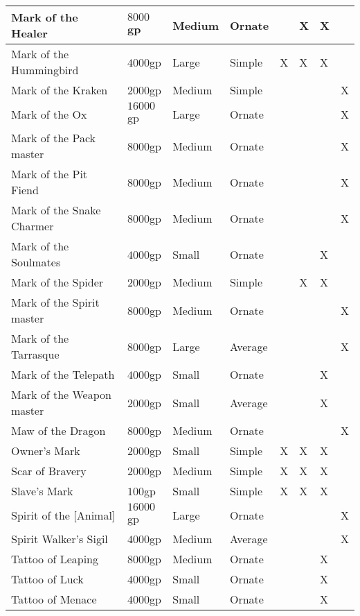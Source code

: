 \documentclass[a5paper,8pt]{book}
\begin{document}
\begin{tabularx}{\textwidth}{|lZZZYYYY|}
    Mark of the Healer & $8000$gp  & Medium  & Ornate  & ~ & X & X & ~ \\\hline 
    Mark of the Hummingbird & $4000$gp  & Large   & Simple  & X & X & X & ~ \\\hline 
    Mark of the Kraken & $2000$gp  & Medium  & Simple  & ~ & ~ & ~ & X \\\hline 
    Mark of the Ox & $16000$gp & Large   & Ornate  & ~ & ~ & ~ & X \\\hline 
    Mark of the Pack master & $8000$gp  & Medium  & Ornate  & ~ & ~ & ~ & X \\\hline 
    Mark of the Pit Fiend & $8000$gp  & Medium  & Ornate  & ~ & ~ & ~ & X \\\hline 
    Mark of the Snake Charmer & $8000$gp  & Medium  & Ornate  & ~ & ~ & ~ & X \\\hline 
    Mark of the Soulmates & $4000$gp  & Small   & Ornate  & ~ & ~ & X & ~ \\\hline 
    Mark of the Spider & $2000$gp  & Medium  & Simple  & ~ & X & X & ~ \\\hline 
    Mark of the Spirit master & $8000$gp  & Medium  & Ornate  & ~ & ~ & ~ & X \\\hline 
    Mark of the Tarrasque & $8000$gp  & Large   & Average & ~ & ~ & ~ & X \\\hline 
    Mark of the Telepath & $4000$gp  & Small   & Ornate  & ~ & ~ & X & ~ \\\hline 
    Mark of the Weapon master & $2000$gp  &  Small  & Average & ~ & ~ & X & ~ \\\hline 
    Maw of the Dragon & $8000$gp  &  Medium & Ornate  & ~ & ~ & ~ & X \\\hline 
    Owner’s Mark & $2000$gp  &  Small  & Simple  & X & X & X & ~ \\\hline 
    Scar of Bravery & $2000$gp  &  Medium & Simple  & X & X & X & ~ \\\hline 
    Slave’s Mark & $100$gp   &  Small  & Simple  & X & X & X & ~ \\\hline 
    Spirit of the [Animal] & $16000$gp &  Large  & Ornate  & ~ & ~ & ~ & X \\\hline 
    Spirit Walker’s Sigil & $4000$gp  &  Medium & Average & ~ & ~ & ~ & X \\\hline 
    Tattoo of Leaping & $8000$gp  &  Medium & Ornate  & ~ & ~ & X & ~ \\\hline 
    Tattoo of Luck & $4000$gp  &  Small  & Ornate  & ~ & ~ & X & ~ \\\hline 
    Tattoo of Menace & $4000$gp  &  Small  & Ornate  & ~ & ~ & X & ~ \\\hline 

\end{tabularx}
\end{document}
